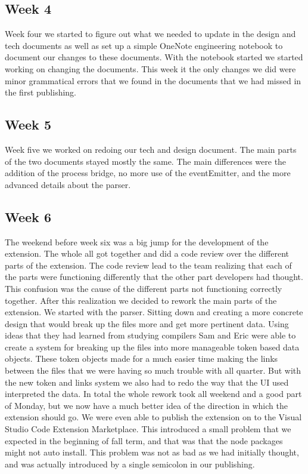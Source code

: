 \documentclass[letterpaper,10pt,titlepage,draftclsnofoot,onecolumn,onesided] {IEEEtran}
\begin{document}
	\subsection{Week 4}
	Week four we started to figure out what we needed to update in the design and tech documents as well as set up a simple OneNote engineering notebook to document our changes to these documents.
	With the notebook started we started working on changing the documents. 
	This week it the only changes we did were minor grammatical errors that we found in the documents that we had missed in the first publishing.

	\subsection{Week 5}
	Week five we worked on redoing our tech and design document.
	The main parts of the two documents stayed mostly the same. 
	The main differences were the addition of the process bridge, no more use of the eventEmitter, and the more advanced details about the parser. 
	
	\subsection{Week 6}
	The weekend before week six was a big jump for the development of the extension. 
	The whole all got together and did a code review over the different parts of the extension.
	The code review lead to the team realizing that each of the parts were functioning differently that the other part developers had thought. 
	This confusion was the cause of the different parts not functioning correctly together. 
	After this realization we decided to rework the main parts of the extension.
	We started with the parser. 
	Sitting down and creating a more concrete design that would break up the files more and get more pertinent data.
	Using ideas that they had learned from studying compilers Sam and Eric were able to create a system for breaking up the files into more manageable token based data objects. 
	These token objects made for a much easier time making the links between the files that we were having so much trouble with all quarter. 
	But with the new token and links system we also had to redo the way that the UI used interpreted the data.
	In total the whole rework took all weekend and a good part of Monday, but we now have a much better idea of the direction in which the extension should go.
	We were even able to publish the extension on to the Visual Studio Code Extension Marketplace. 
	This introduced a small problem that we expected in the beginning of fall term, and that was that the node packages might not auto install. 
	This problem was not as bad as we had initially thought, and was actually introduced by a single semicolon in our publishing.
	
\end{document}
